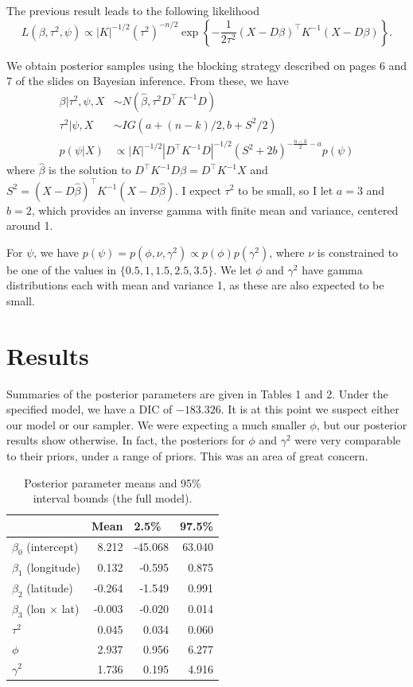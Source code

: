 \documentclass[12pt]{article}
\begin{document}
The previous result leads to the following likelihood
\[ L(\beta, \tau^2, \psi) \propto |K|^{-1/2}(\tau^2)^{-n/2}\exp\left\{-\frac{1}{2\tau^2}(X-D\beta)^\top K^{-1}(X-D\beta)\right\}. \]

We obtain posterior samples using the blocking strategy described on pages 6 and 7 of the slides on Bayesian inference. From these, we have
\begin{align*}
\beta|\tau^2,\psi,X &\sim N(\hat{\beta}, \tau^2 D^\top K^{-1} D) \\
\tau^2|\psi,X &\sim IG(a + (n-k)/2, b + S^2/2) \\
p(\psi|X) &\propto |K|^{-1/2}|D^\top K^{-1} D|^{-1/2}(S^2+2b)^{-\frac{n-k}{2}-a}p(\psi) 
\end{align*}
where $\hat{\beta}$ is the solution to $D^\top K^{-1} D \beta = D^\top K^{-1} X$ and $S^2 = (X-D\hat{\beta})^\top K^{-1} (X - D\hat{\beta})$. I expect $\tau^2$ to be small, so I let $a = 3$ and $b = 2$, which provides an inverse gamma with finite mean and variance, centered around 1.
\bigskip

For $\psi$, we have $p(\psi)=p(\phi,\nu,\gamma^2)\propto p(\phi)p(\gamma^2)$, where $\nu$ is constrained to be one of the values in $\{0.5, 1, 1.5, 2.5, 3.5\}$. We let $\phi$ and $\gamma^2$ have gamma distributions each with mean and variance 1, as these are also expected to be small.

\section{Results}

Summaries of the posterior parameters are given in Tables 1 and 2. Under the specified model, we have a DIC of $-183.326$. It is at this point we suspect either our model or our sampler. We were expecting a much smaller $\phi$, but our posterior results show otherwise. In fact, the posteriors for $\phi$ and $\gamma^2$ were very comparable to their priors, under a range of priors. This was an area of great concern.

\begin{table}[ht]
\begin{center}
\begin{tabular}{lrrr}
\hline\hline
 & \multicolumn{1}{l}{Mean}
 & \multicolumn{1}{l}{2.5\%}
 & \multicolumn{1}{l}{97.5\%} \\ \hline
$\beta_0$ (intercept) &  8.212 & -45.068 & 63.040 \\
$\beta_1$ (longitude) &  0.132 &  -0.595 &  0.875 \\
$\beta_2$ (latitude) & -0.264 &  -1.549 &  0.991 \\
$\beta_3$ (lon $\times$ lat) & -0.003 &  -0.020 &  0.014 \\
$\tau^2$   & 0.045 & 0.034 & 0.060 \\
$\phi$     & 2.937 & 0.956 & 6.277 \\
$\gamma^2$ & 1.736 & 0.195 & 4.916 \\
\hline\hline
\end{tabular}
\end{center}
\caption{Posterior parameter means and 95\% interval bounds (the full model).}
\end{table}
\end{document}
